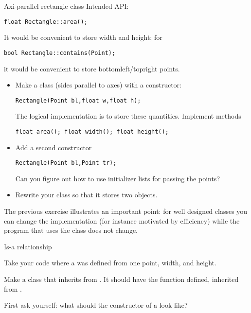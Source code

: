 \begin{block}{Axi-parallel rectangle class}
  \label{ex:geom:rect}
  Intended API:
\begin{verbatim}
float Rectangle::area();
\end{verbatim}
It would be convenient to store width and height; for 
\begin{verbatim}
bool Rectangle::contains(Point);  
\end{verbatim}
it would be convenient to store bottomleft/topright points.
\end{block}

\begin{exercise}
  \label{ex:geom:rect2}
  \begin{itemize}
  \item
    Make a class  (sides parallel to axes) with a constructor:
\begin{verbatim}
Rectangle(Point bl,float w,float h);
\end{verbatim}
The logical implementation is to store these quantities.
Implement methods
\begin{verbatim}
float area(); float width(); float height();
\end{verbatim}
\item Add a second constructor
\begin{verbatim}
Rectangle(Point bl,Point tr);
\end{verbatim}
Can you figure out how to use initializer lists for passing the points?
\item Rewrite your class so that it stores two  objects.
\end{itemize}
\end{exercise}

The previous exercise illustrates an important point: for well
designed classes you can change the implementation (for instance motivated
by efficiency) while the program that uses the class does not change.

 {Is-a relationship}
\label{sec:geom-isa}

\prerequisite{\ref{sec:inheritance}}

\begin{exercise}
  \label{ex:geom:square}
  Take your code where a  was defined from one point,
  width, and height.

  Make a class  that inherits from . It should
  have the function  defined, inherited from .

  First ask yourself: what should the constructor of a  look like?
\end{exercise}

